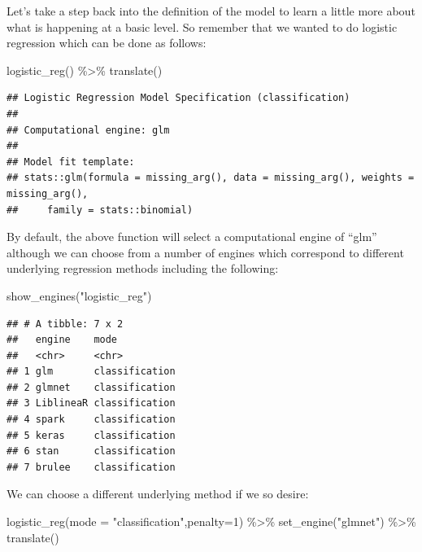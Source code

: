 \documentclass[
]{article}
\newenvironment{Shaded}{\begin{snugshade}}{\end{snugshade}}
\newcommand{\AttributeTok}[1]{\textcolor[rgb]{0.77,0.63,0.00}{#1}}
\newcommand{\DecValTok}[1]{\textcolor[rgb]{0.00,0.00,0.81}{#1}}
\newcommand{\FunctionTok}[1]{\textcolor[rgb]{0.00,0.00,0.00}{#1}}
\newcommand{\NormalTok}[1]{#1}
\newcommand{\SpecialCharTok}[1]{\textcolor[rgb]{0.00,0.00,0.00}{#1}}
\newcommand{\StringTok}[1]{\textcolor[rgb]{0.31,0.60,0.02}{#1}}
\begin{document}
Let's take a step back into the definition of the model to learn a
little more about what is happening at a basic level. So remember that
we wanted to do logistic regression which can be done as follows:

\begin{Shaded}
\begin{Highlighting}[]
\FunctionTok{logistic\_reg}\NormalTok{() }\SpecialCharTok{\%\textgreater{}\%} \FunctionTok{translate}\NormalTok{()}
\end{Highlighting}
\end{Shaded}

\begin{verbatim}
## Logistic Regression Model Specification (classification)
## 
## Computational engine: glm 
## 
## Model fit template:
## stats::glm(formula = missing_arg(), data = missing_arg(), weights = missing_arg(), 
##     family = stats::binomial)
\end{verbatim}

By default, the above function will select a computational engine of
``glm'' although we can choose from a number of engines which correspond
to different underlying regression methods including the following:

\begin{Shaded}
\begin{Highlighting}[]
 \FunctionTok{show\_engines}\NormalTok{(}\StringTok{"logistic\_reg"}\NormalTok{)}
\end{Highlighting}
\end{Shaded}

\begin{verbatim}
## # A tibble: 7 x 2
##   engine    mode          
##   <chr>     <chr>         
## 1 glm       classification
## 2 glmnet    classification
## 3 LiblineaR classification
## 4 spark     classification
## 5 keras     classification
## 6 stan      classification
## 7 brulee    classification
\end{verbatim}

We can choose a different underlying method if we so desire:

\begin{Shaded}
\begin{Highlighting}[]
\FunctionTok{logistic\_reg}\NormalTok{(}\AttributeTok{mode =} \StringTok{"classification"}\NormalTok{,}\AttributeTok{penalty=}\DecValTok{1}\NormalTok{) }\SpecialCharTok{\%\textgreater{}\%} 
  \FunctionTok{set\_engine}\NormalTok{(}\StringTok{"glmnet"}\NormalTok{) }\SpecialCharTok{\%\textgreater{}\%} 
  \FunctionTok{translate}\NormalTok{()}
\end{Highlighting}
\end{Shaded}
\end{document}

